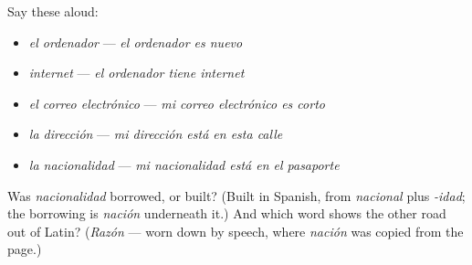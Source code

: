 Say these aloud:

\begin{itemize}
\raggedright
  \item \emph{el ordenador} — \emph{el ordenador es nuevo}
  \item \emph{internet} — \emph{el ordenador tiene internet}
  \item \emph{el correo electrónico} — \emph{mi correo electrónico es corto}
  \item \emph{la dirección} — \emph{mi dirección está en esta calle}
  \item \emph{la nacionalidad} — \emph{mi nacionalidad está en el pasaporte}
\end{itemize}

\begin{tcolorbox}[breakable,colback=teal!4,colframe=teal!35!black,title={Before you move on}]
Was \emph{nacionalidad} borrowed, or built? (Built in Spanish, from \emph{nacional} plus \emph{-idad}; the borrowing is \emph{nación} underneath it.) And which word shows the other road out of Latin? (\emph{Razón} — worn down by speech, where \emph{nación} was copied from the page.)
\end{tcolorbox}
